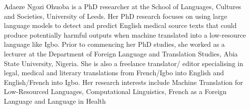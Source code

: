 Adaeze Ngozi Ohuoba is a PhD researcher at the School of Languages, Cultures and Societies, University of Leeds. Her PhD research focuses on using large language models to detect and predict English medical source texts that could produce potentially harmful outputs when machine translated into a low-resource language like Igbo.
Prior to commencing her PhD studies, she worked as a lecturer at the Department of Foreign Language and Translation Studies, Abia State University, Nigeria. She is also a freelance translator/ editor specialising in legal, medical and literary translations from French/Igbo into English and English/French into Igbo.
Her research interests include Machine Translation for Low-Resourced Languages, Computational Linguistics, French as a Foreign Language and Language in Health
